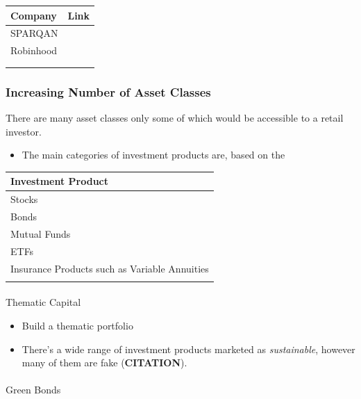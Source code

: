 \documentclass[
  letterpaper,
  DIV=11,
  numbers=noendperiod]{scrartcl}
\makeatletter
\let\oldparagraph\paragraph
\renewcommand{\paragraph}{
    \@ifstar
      \xxxParagraphStar
      \xxxParagraphNoStar
  }
\newcommand{\xxxParagraphStar}[1]{\oldparagraph*{#1}\mbox{}}
\newcommand{\xxxParagraphNoStar}[1]{\oldparagraph{#1}\mbox{}}
\providecommand{\tightlist}{%
  \setlength{\itemsep}{0pt}\setlength{\parskip}{0pt}}\usepackage{longtable,booktabs,array}
\makeatother
\begin{document}
\begin{longtable}[]{@{}ll@{}}
\toprule\noalign{}
Company & Link \\
\midrule\noalign{}
\endhead
\bottomrule\noalign{}
\endlastfoot
SPARQAN & \\
Robinhood & \\
& \\
& \\
\end{longtable}

\subsubsection{Increasing Number of Asset
Classes}\label{increasing-number-of-asset-classes}

There are many asset classes only some of which would be accessible to a
retail investor.

\begin{itemize}
\tightlist
\item
  The main categories of investment products are, based on the
  \citet{InvestmentProductsInvestor}
\end{itemize}

\begin{longtable}[]{@{}l@{}}
\toprule\noalign{}
Investment Product \\
\midrule\noalign{}
\endhead
\bottomrule\noalign{}
\endlastfoot
Stocks \\
Bonds \\
Mutual Funds \\
ETFs \\
Insurance Products such as Variable Annuities \\
 \\
\end{longtable}

\paragraph{Thematic Capital}\label{thematic-capital}

\begin{itemize}
\tightlist
\item
  Build a thematic portfolio
\item
  There's a wide range of investment products marketed as
  \emph{sustainable}, however many of them are fake (\textbf{CITATION}).
\end{itemize}

\paragraph{Green Bonds}\label{green-bonds}
\end{document}
